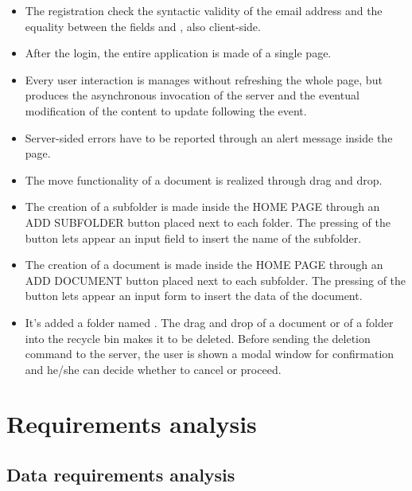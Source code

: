 \documentclass[a4paper, dvipsnames]{article}
\begin{document}
	\begin{multicols}{2}
		\begin{itemize}
			\item The registration check the syntactic validity of the email address and the equality between the fields  and , also client-side.
			\item After the login, the entire application is made of a single page.
			\item Every user interaction is manages without refreshing the whole page, but produces the asynchronous invocation of the server and the eventual modification of the content to update following the event.
			\item Server-sided errors have to be reported through an alert message inside the page.
			\item The move functionality of a document is realized through drag and drop.
			\item The creation of a subfolder is made inside the HOME PAGE through an ADD SUBFOLDER button placed next to each folder. The pressing of the button lets appear an input field to insert the name of the subfolder.
			\item The creation of a document is made inside the HOME PAGE through an ADD DOCUMENT button placed next to each subfolder. The pressing of the button lets appear an input form to insert the data of the document.
			\item It's added a folder named . The drag and drop of a document or of a folder into the recycle bin makes it to be deleted. Before sending the deletion command to the server, the user is shown a modal window for confirmation and he/she can decide whether to cancel or proceed.
		\end{itemize}
	\end{multicols}
	
	\pagebreak
	
	\section{Requirements analysis}
	
	\subsection{Data requirements analysis}
	
\end{document}
